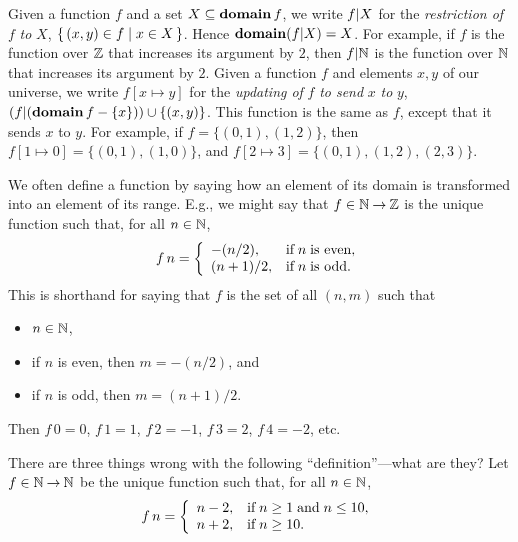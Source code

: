 Given a function $f$ and a set $X\subseteq\mathbf{domain}\,f$, we write
$f\mathord{\mid} X$ for the \emph{restriction of} $f$ \emph{to} $X$,
%
%
%
%
$\{ \, (x,y)\in f \mid x\in X \, \}$. Hence $\mathbf{domain}(f\mathord{\mid} X)=X$.  For example,
if $f$ is the function over $\mathbb{Z}$ that increases its
argument by $2$, then $f\mathord{\mid} \mathbb{N}$ is the function over $\mathbb{N}$ that
increases its argument by $2$.
Given a function $f$ and elements $x,y$ of our universe,
we write $f[x\mapsto y]$ for the \emph{updating of} $f$
%
%
%
%
\emph{to send} $x$ \emph{to} $y$,
$(f\mathord{\mid}(\mathbf{domain}\,f-\{x\}))\cup\{(x,y)\}$.  This function is
the same as $f$, except that it sends $x$ to $y$.
For example, if $f=\{(0, 1), (1, 2)\}$, then
$f[1\mapsto 0]=\{(0,1), (1, 0)\}$, and $f[2\mapsto 3]=
\{(0, 1), (1, 2), (2,3)\}$.

We often define a function by saying how an element of its domain
is transformed into an element of its range.  E.g.,
we might say that $f\in\mathbb{N}\mathbin{\to}\mathbb{Z}$ is the unique function such that,
for all $n\in\mathbb{N}$,
\begin{displaymath}
f\,n =
\casesdef{-(n/2),}{\eqtxtr{if}n\eqtxtl{is even},}%
         {(n + 1)/2,}{\eqtxtr{if}n\eqtxtl{is odd}.}
\end{displaymath}
This is shorthand for saying that $f$ is the set of all
$(n, m)$ such that
\begin{itemize}
\item $n\in\mathbb{N}$,

\item if $n$ is even, then $m=-(n/2)$, and

\item if $n$ is odd, then $m=(n + 1)/2$.
\end{itemize}
Then $f\,0 = 0$, $f\,1 = 1$, $f\,2 = -1$, $f\, 3 = 2$,
$f\,4 = -2$, etc.

\begin{exercise}
There are three things wrong with the following ``definition''---what
are they?
Let $f\in\mathbb{N}\mathbin{\to}\mathbb{N}$ be the unique function such that,
for all $n\in\mathbb{N}$,
\begin{displaymath}
f\,n =
\casesdef{n-2,}{\eqtxtr{if}n\geq 1\eqtxt{and}n\leq 10,}%
         {n+2,}{\eqtxtr{if}n\geq 10.}
\end{displaymath}
\end{exercise}

